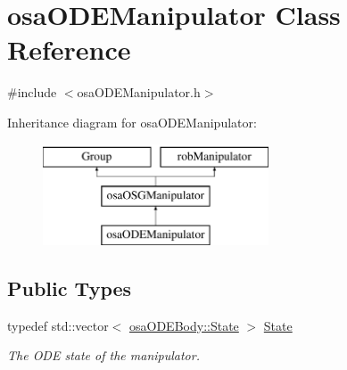 \hypertarget{classosa_o_d_e_manipulator}{}\section{osa\+O\+D\+E\+Manipulator Class Reference}
\label{classosa_o_d_e_manipulator}


{\ttfamily \#include $<$osa\+O\+D\+E\+Manipulator.\+h$>$}

Inheritance diagram for osa\+O\+D\+E\+Manipulator\+:\begin{figure}[H]
\begin{center}
\leavevmode
\includegraphics[height=3.000000cm]{d6/dbb/classosa_o_d_e_manipulator}
\end{center}
\end{figure}
\subsection*{Public Types}
\begin{DoxyCompactItemize}
\item 
typedef std\+::vector$<$ \hyperlink{structosa_o_d_e_body_1_1_state}{osa\+O\+D\+E\+Body\+::\+State} $>$ \hyperlink{classosa_o_d_e_manipulator_a56c8457aa6c0240b62580dcfce383ed2}{State}
\begin{DoxyCompactList}\small\item\em The O\+D\+E state of the manipulator. \end{DoxyCompactList}\end{DoxyCompactItemize}
